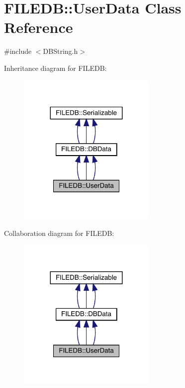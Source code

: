\hypertarget{classFILEDB_1_1UserData}{}\section{F\+I\+L\+E\+DB\+:\+:User\+Data Class Reference}
\label{classFILEDB_1_1UserData}


{\ttfamily \#include $<$D\+B\+String.\+h$>$}



Inheritance diagram for F\+I\+L\+E\+DB\+:
\nopagebreak
\begin{figure}[H]
\begin{center}
\leavevmode
\includegraphics[width=188pt]{d4/d81/classFILEDB_1_1UserData__inherit__graph}
\end{center}
\end{figure}


Collaboration diagram for F\+I\+L\+E\+DB\+:
\nopagebreak
\begin{figure}[H]
\begin{center}
\leavevmode
\includegraphics[width=188pt]{d6/d67/classFILEDB_1_1UserData__coll__graph}
\end{center}
\end{figure}
